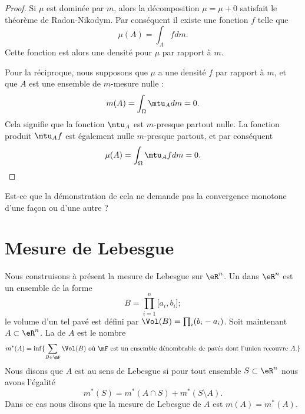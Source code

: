 \begin{proof}
    Si \( \mu\) est dominée par \( m\), alors la décomposition \( \mu=\mu+0\) satisfait le théorème de Radon-Nikodym. Par conséquent il existe une fonction \( f\) telle que
    \begin{equation}
        \mu(A)=\int_Afdm.
    \end{equation}
    Cette fonction est alors une densité pour \( \mu\) par rapport à \( m\).

    Pour la réciproque, nous supposons que \( \mu\) a une densité \( f\) par rapport à \( m\), et que \( A\) est une ensemble de \( m\)-mesure nulle :
    \begin{equation}
        m(A)=\int_{\Omega}\mtu_Adm=0.
    \end{equation}
    Cela signifie que la fonction \( \mtu_A\) est \( m\)-presque partout nulle. La fonction produit \( \mtu_Af\) est également nulle \( m\)-presque partout, et par conséquent
    \begin{equation}
        \mu(A)=\int_{\Omega}\mtu_Afdm=0.
    \end{equation}
\end{proof}

\begin{probleme}
    Est-ce que la démonstration de cela ne demande pas la convergence monotone d'une façon ou d'une autre ?
\end{probleme}

\section{Mesure de Lebesgue}

Nous construisons à présent la mesure de Lebesgue sur \( \eR^n\). Un  dans \( \eR^n\) est un ensemble de la forme 
\begin{equation}
    B=\prod_{i=1}^n\mathopen[ a_i , b_i \mathclose];
\end{equation}
le volume d'un tel pavé est défini par \( \Vol(B)=\prod_i(b_i-a_i)\). Soit maintenant \( A\subset \eR^n\). La  de \( A\) est le nombre
\begin{equation}
    m^*(A)=\inf\{ \sum_{B\in\mF}\Vol(B)\text{ où \( \mF\) est un ensemble dénombrable de pavés dont l'union recouvre \( A\).} \}
\end{equation}
Nous disons que \( A\) est  au sens de Lebesgue si pour tout ensemble \( S\subset \eR^n\) nous avons l'égalité
\begin{equation}
    m^*(S)=m^*(A\cap S)+m^*(S\setminus A).
\end{equation}
Dans ce cas nous disons que la mesure de Lebesgue de \( A\) est \( m(A)=m^*(A)\).

